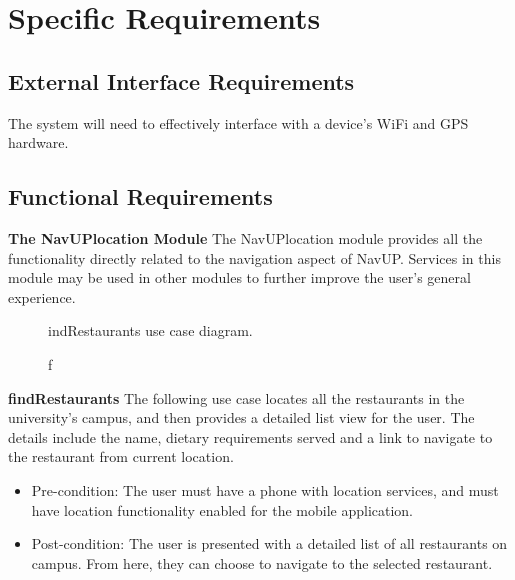 \documentclass[12pt,a4paper]{article}
\begin{document}
	\section{Specific Requirements}

		\subsection{External Interface Requirements}

			The system will need to effectively interface with a device's WiFi and GPS
			hardware.

		\subsection{Functional Requirements}

			\textbf{The NavUPlocation Module} \newline \newline
			The NavUPlocation module provides all the functionality directly related to the navigation aspect of NavUP. 					Services in this module may be used in other modules to further improve the user's general experience.

			\medskip
			
			\begin{figure}[h!]
				\caption findRestaurants use case diagram.
			\end{figure}			
			
			\textbf{findRestaurants}
			The following use case locates all the restaurants in the university's campus, and then provides a detailed list 				view for the user. The details include the name, dietary requirements served and a link to navigate to the 						restaurant from current location.
			
			\begin{itemize}
			\item Pre-condition: The user must have a phone with location services, and must have location functionality        				  enabled for the mobile application.
			\item Post-condition: The user is presented with a detailed list of all restaurants on campus. From here, they can 				  choose to navigate to the selected restaurant.
			\end{itemize}
			
\end{document}
